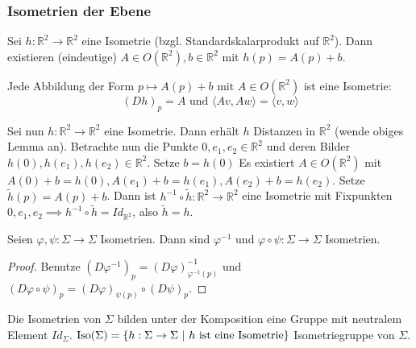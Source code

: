 \documentclass[../main.tex]{subfiles}
\begin{document}
\subsubsection*{Isometrien der Ebene}
Sei $h:\mathbb{R}^2 \to \mathbb{R}^2$ eine Isometrie (bzgl. Standardskalarprodukt auf $\mathbb{R}^2$).
Dann existieren (eindeutige) $A \in O(\mathbb{R}^2), b \in \mathbb{R}^2$ mit $h(p)=A(p)+b$.
\begin{remark}
    Jede Abbildung der Form $p \mapsto A(p)+b$ mit $A\in O(\mathbb{R}^2)$ ist eine Isometrie:
    $$(Dh)_p = A \text{ und } \langle Av, Aw \rangle = \langle v, w \rangle$$
\end{remark}
Sei nun $h : \mathbb{R}^2 \to \mathbb{R}^2$ eine Isometrie. Dann erhält $h$ Distanzen in $\mathbb{R}^2$ (wende obiges Lemma an).
Betrachte nun die Punkte $0, e_1, e_2 \in \mathbb{R}^2$ und deren Bilder $h(0), h(e_1), h(e_2) \in \mathbb{R}^2$.
Setze $b=h(0)$
Es existiert $A\in O(\mathbb{R}^2)$ mit $A(0)+b=h(0), A(e_1)+b=h(e_1), A(e_2)+b = h(e_2)$.
Setze $\tilde{h}(p)=A(p)+b$. Dann ist $h^{-1}\circ \tilde{h}: \mathbb{R}^2 \to \mathbb{R}^2$ eine Isometrie mit Fixpunkten $0,e_1,e_2 \implies h^{-1}\circ \tilde{h} = Id_{\mathbb{R}^2}$, also $\tilde{h}= h$.

\begin{lemma}
    Seien $\varphi , \psi : \Sigma \to \Sigma $ Isometrien. Dann sind $\varphi ^{-1}$ und $\varphi \circ \psi : \Sigma \to \Sigma$ Isometrien.
\end{lemma}
\begin{proof}
    Benutze $(D\varphi^{-1})_p=(D\varphi)^{-1}_{\varphi^{-1}(p)}$ und $(D\varphi \circ \psi)_p=(D\varphi)_{\psi (p)}\circ (D\psi)_{p}$.
\end{proof}
\begin{consequence}
    Die Isometrien von $\Sigma$ bilden unter der Komposition eine Gruppe mit neutralem Element $Id_{\Sigma}$.
    $\operatorname{Iso}(\Sigma)= \{h: \Sigma \to \Sigma \ | \ h \text{ ist eine Isometrie} \}$ Isometriegruppe von $\Sigma$.
\end{consequence}
\end{document}
